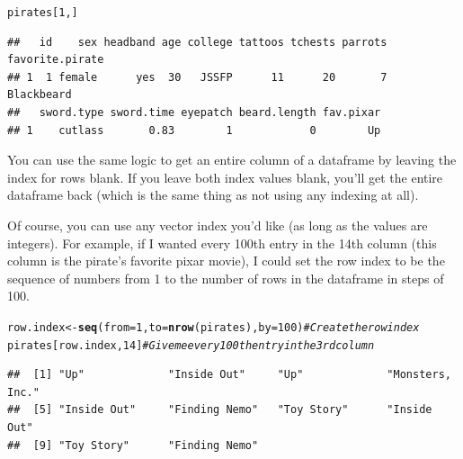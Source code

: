\documentclass{tufte-book}\usepackage[]{graphicx}\usepackage[]{color}
\makeatletter
\newcommand{\hlnum}[1]{\textcolor[rgb]{0.686,0.059,0.569}{#1}}%
\newcommand{\hlcom}[1]{\textcolor[rgb]{0.678,0.584,0.686}{\textit{#1}}}%
\newcommand{\hlstd}[1]{\textcolor[rgb]{0.345,0.345,0.345}{#1}}%
\newcommand{\hlkwb}[1]{\textcolor[rgb]{0.69,0.353,0.396}{#1}}%
\newcommand{\hlkwc}[1]{\textcolor[rgb]{0.333,0.667,0.333}{#1}}%
\newcommand{\hlkwd}[1]{\textcolor[rgb]{0.737,0.353,0.396}{\textbf{#1}}}%
\newenvironment{kframe}{%
 \def\at@end@of@kframe{}%
 \ifinner\ifhmode%
  \def\at@end@of@kframe{\end{minipage}}%
  \begin{minipage}{\columnwidth}%
 \fi\fi%
 \def\FrameCommand##1{\hskip\@totalleftmargin \hskip-\fboxsep
 \colorbox{shadecolor}{##1}\hskip-\fboxsep
     \hskip-\linewidth \hskip-\@totalleftmargin \hskip\columnwidth}%
 \MakeFramed {\advance\hsize-\width
   \@totalleftmargin\z@ \linewidth\hsize
   \@setminipage}}%
 {\par\unskip\endMakeFramed%
 \at@end@of@kframe}
\newenvironment{knitrout}{}{} %
\makeatother
\begin{document}
\begin{knitrout}
\color{fgcolor}\begin{kframe}
\begin{alltt}
\hlstd{pirates[}\hlnum{1}\hlstd{,]}
\end{alltt}
\begin{verbatim}
##   id    sex headband age college tattoos tchests parrots favorite.pirate
## 1  1 female      yes  30   JSSFP      11      20       7      Blackbeard
##   sword.type sword.time eyepatch beard.length fav.pixar
## 1    cutlass       0.83        1            0        Up
\end{verbatim}
\end{kframe}
\end{knitrout}

You can use the same logic to get an entire column of a dataframe by leaving the index for rows blank. If you leave both index values blank, you'll get the entire dataframe back (which is the same thing as not using any indexing at all).

Of course, you can use any vector index you'd like (as long as the values are integers). For example, if I wanted every 100th entry in the 14th column (this column is the pirate's favorite pixar movie), I could set the row index to be the sequence of numbers from 1 to the number of rows in the dataframe in steps of 100.



\begin{knitrout}
\color{fgcolor}\begin{kframe}
\begin{alltt}
\hlstd{row.index} \hlkwb{<-} \hlkwd{seq}\hlstd{(}\hlkwc{from} \hlstd{=} \hlnum{1}\hlstd{,} \hlkwc{to} \hlstd{=} \hlkwd{nrow}\hlstd{(pirates),} \hlkwc{by} \hlstd{=} \hlnum{100}\hlstd{)} \hlcom{# Create the row index}
\hlstd{pirates[row.index,} \hlnum{14}\hlstd{]} \hlcom{# Give me every 100th entry in the 3rd column}
\end{alltt}
\begin{verbatim}
##  [1] "Up"             "Inside Out"     "Up"             "Monsters, Inc."
##  [5] "Inside Out"     "Finding Nemo"   "Toy Story"      "Inside Out"    
##  [9] "Toy Story"      "Finding Nemo"
\end{verbatim}
\end{kframe}
\end{knitrout}

\end{document}
